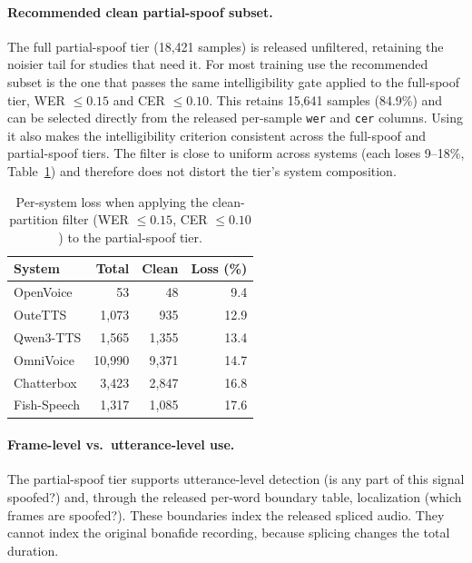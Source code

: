 \documentclass[11pt]{report}
\begin{document}
\paragraph{Recommended clean partial-spoof subset.} The full
partial-spoof tier (18{,}421 samples) is released unfiltered, retaining
the noisier tail for studies that need it. For most training use the
recommended subset is the one that passes the same intelligibility gate
applied to the full-spoof tier, WER $\leq 0.15$ and CER $\leq 0.10$.
This retains 15{,}641 samples (84.9\%) and can be selected directly
from the released per-sample \texttt{wer} and \texttt{cer} columns.
Using it also makes the intelligibility criterion consistent across the
full-spoof and partial-spoof tiers. The filter is close to uniform
across systems (each loses 9--18\%, Table~\ref{tab:cleanlossbysystem})
and therefore does not distort the tier's system composition.

\begin{table}[H]
\centering
\caption{Per-system loss when applying the clean-partition filter
(WER $\leq 0.15$, CER $\leq 0.10$) to the partial-spoof tier.}
\label{tab:cleanlossbysystem}
\small
\begin{tabular}{lrrr}
\toprule
\textbf{System} & \textbf{Total} & \textbf{Clean} & \textbf{Loss (\%)} \\
\midrule
OpenVoice   &    53    &    48    &  9.4 \\
OuteTTS     &  1{,}073 &   935    & 12.9 \\
Qwen3-TTS   &  1{,}565 & 1{,}355  & 13.4 \\
OmniVoice   & 10{,}990 & 9{,}371  & 14.7 \\
Chatterbox  &  3{,}423 & 2{,}847  & 16.8 \\
Fish-Speech &  1{,}317 & 1{,}085  & 17.6 \\
\bottomrule
\end{tabular}
\end{table}

\paragraph{Frame-level vs.\ utterance-level use.} The
partial-spoof tier supports utterance-level detection (is any part of
this signal spoofed?) and, through the released per-word boundary table,
localization (which frames are spoofed?). These boundaries index the
released spliced audio. They cannot index the original bonafide
recording, because splicing changes the total duration.
\end{document}
